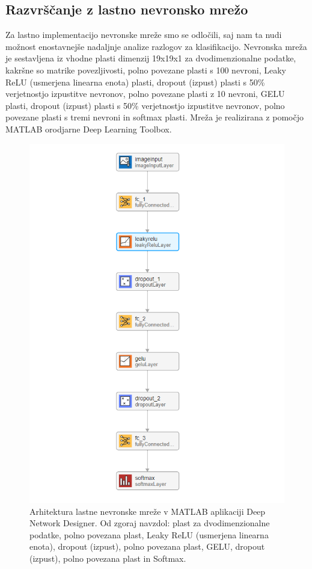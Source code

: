 \subsection{Razvrščanje z lastno nevronsko mrežo}
Za lastno implementacijo nevronske mreže smo se odločili, saj nam ta nudi možnost enostavnejše nadaljnje analize razlogov za klasifikacijo.
Nevronska mreža je sestavljena iz vhodne plasti dimenzij 19x19x1 za dvodimenzionalne podatke, kakršne so matrike povezljivosti, polno povezane plasti s 100 nevroni, Leaky ReLU (usmerjena linearna enota) plasti, dropout (izpust) plasti s 50\% verjetnostjo izpustitve nevronov, polno povezane plasti z 10 nevroni, GELU plasti, dropout (izpust) plasti s 50\% verjetnostjo izpustitve nevronov, polno povezane plasti s tremi nevroni in softmax plasti. Mreža je realizirana z pomočjo MATLAB orodjarne Deep Learning Toolbox. 
\begin{figure}[h!]
\begin{center}
\includegraphics[width=0.8\linewidth]{slike/Neural network.png}
\end{center}
\caption[Arhitektura lastne nevronske mreže.]{Arhitektura lastne nevronske mreže v MATLAB aplikaciji Deep Network Designer. Od zgoraj navzdol: plast za dvodimenzionalne podatke, polno povezana plast, Leaky ReLU (usmerjena linearna enota), dropout (izpust), polno povezana plast, GELU, dropout (izpust), polno povezana plast in Softmax.}
\end{figure}






